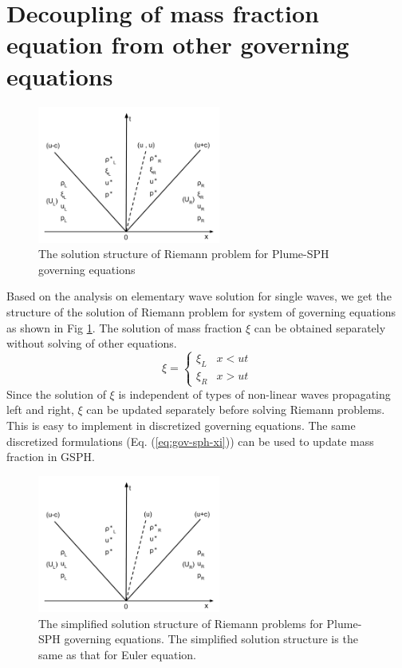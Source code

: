 \section{Decoupling of mass fraction equation from other governing equations}
\begin{figure}
\center
\includegraphics[width=6cm]{Chapter-2/Figures/Solution_Structure_RP}
\caption{The solution structure of Riemann problem for Plume-SPH governing equations}
\label{fig:Solution_Structure_RP}
\end{figure}
Based on the analysis on elementary wave solution for single waves, we get the structure of the solution of Riemann problem for system of governing equations as shown in Fig \ref{fig:Solution_Structure_RP}. The solution of mass fraction $\xi$ can be obtained separately without solving of other equations.
\begin{equation}
\xi =  \begin{cases} 
      \xi_L & x< ut\\
      \xi_R & x > ut
\end{cases}
\label{eq:RP_solution_xi}
\end{equation}
Since the solution of $\xi$ is independent of types of non-linear waves propagating left and right, $\xi$ can be updated separately before solving Riemann problems. This is easy to implement in discretized governing equations. The same discretized formulations (Eq. (\ref{eq:gov-sph-xi})) can be used to update mass fraction in GSPH.
\begin{figure}
\center
\includegraphics[width=6cm]{Chapter-2/Figures/Solution_Structure_RP_simplified}
\caption{The simplified solution structure of Riemann problems for Plume-SPH governing equations. The simplified solution structure is the same as that for Euler equation.}
\label{fig:Solution_Structure_RP_simplified}
\end{figure}

